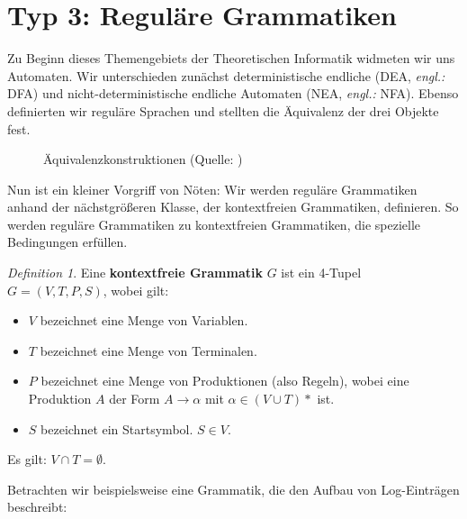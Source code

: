 \documentclass[11pt,a4paper]{scrreport}
\theoremstyle{remark}
\theoremstyle{custom}
\newtheorem{definition}{Definition}[section]
\begin{document}
\section{Typ 3: Reguläre Grammatiken}
Zu Beginn dieses Themengebiets der Theoretischen Informatik widmeten wir uns Automaten. Wir unterschieden zunächst deterministische endliche (DEA, \textit{engl.:} DFA) und nicht-deterministische endliche Automaten (NEA, \textit{engl.:} NFA). Ebenso definierten wir reguläre Sprachen und stellten die Äquivalenz der drei Objekte fest.
\begin{figure}[h!]
\centering
{}
\caption{Äquivalenzkonstruktionen (Quelle: \parencite[][S. 30]{Hopcroft})}
\end{figure}
Nun ist ein kleiner Vorgriff von Nöten: Wir werden reguläre Grammatiken anhand der nächstgrößeren Klasse, der kontextfreien Grammatiken, definieren. So werden reguläre Grammatiken zu kontextfreien Grammatiken, die spezielle Bedingungen erfüllen. 
\begin{definition}
Eine \textbf{kontextfreie Grammatik} $G$ ist ein 4-Tupel $G = (V, T, P, S)$, wobei gilt:
\begin{itemize}
\item $V$ bezeichnet eine Menge von Variablen.
\item $T$ bezeichnet eine Menge von Terminalen.
\item $P$ bezeichnet eine Menge von Produktionen (also Regeln), wobei eine Produktion $A$ der Form $ A \rightarrow \alpha$ mit $\alpha \in (V \cup T)*$ ist.
\item $S$ bezeichnet ein Startsymbol. $S \in V$.
\end{itemize}
Es gilt: $V \cap T = \emptyset$.
\end{definition}
Betrachten wir beispielsweise eine Grammatik, die den Aufbau von Log-Einträgen beschreibt:
\end{document}
